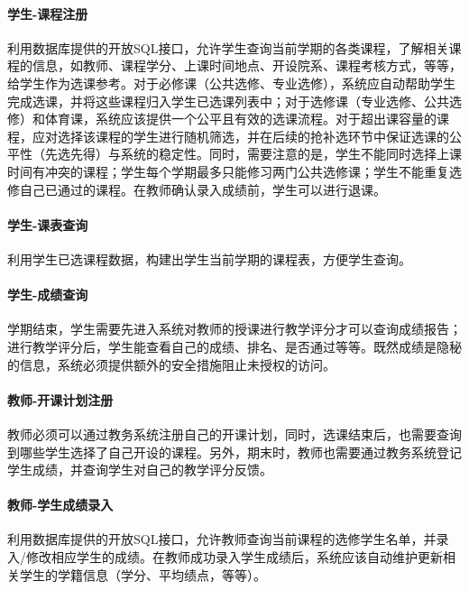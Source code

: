 \paragraph{学生-课程注册}

利用数据库提供的开放SQL接口，允许学生查询当前学期的各类课程，了解相关课程的信息，如教师、课程学分、上课时间地点、开设院系、课程考核方式，等等，给学生作为选课参考。对于必修课（公共选修、专业选修），系统应自动帮助学生完成选课，并将这些课程归入学生已选课列表中；对于选修课（专业选修、公共选修）和体育课，系统应该提供一个公平且有效的选课流程。对于超出课容量的课程，应对选择该课程的学生进行随机筛选，并在后续的抢补选环节中保证选课的公平性（先选先得）与系统的稳定性。同时，需要注意的是，学生不能同时选择上课时间有冲突的课程；学生每个学期最多只能修习两门公共选修课；学生不能重复选修自己已通过的课程。在教师确认录入成绩前，学生可以进行退课。

\paragraph{学生-课表查询}
  
利用学生已选课程数据，构建出学生当前学期的课程表，方便学生查询。

\paragraph{学生-成绩查询}
  
学期结束，学生需要先进入系统对教师的授课进行教学评分才可以查询成绩报告；进行教学评分后，学生能查看自己的成绩、排名、是否通过等等。既然成绩是隐秘的信息，系统必须提供额外的安全措施阻止未授权的访问。

\paragraph{教师-开课计划注册}
  
教师必须可以通过教务系统注册自己的开课计划，同时，选课结束后，也需要查询到哪些学生选择了自己开设的课程。另外，期末时，教师也需要通过教务系统登记学生成绩，并查询学生对自己的教学评分反馈。
  
\paragraph{教师-学生成绩录入}
  
利用数据库提供的开放SQL接口，允许教师查询当前课程的选修学生名单，并录入/修改相应学生的成绩。在教师成功录入学生成绩后，系统应该自动维护更新相关学生的学籍信息（学分、平均绩点，等等）。

